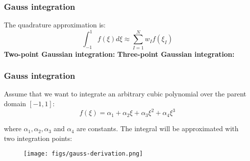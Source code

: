 \documentclass[notes]{beamer}
\begin{document}
\begin{frame}
\frametitle{Gauss integration}
The quadrature approximation is:
\begin{equation*}
\int_{-1}^{1} f(\xi)d \xi \approx \sum_{I=1}^N w_I f(\xi_I)
\end{equation*}
\textbf{Two-point Gaussian integration:}
\textbf{Three-point Gaussian integration:}
\end{frame}

\begin{frame}
\frametitle{Gauss integration}
Assume that we want to integrate an arbitrary cubic polynomial over the parent domain $[-1, 1]$:
\begin{equation*}
f(\xi) = \alpha_1 + \alpha_2 \xi + \alpha_3 \xi^2 + \alpha_4 \xi^3
\end{equation*}

where $\alpha_1, \alpha_2, \alpha_3$ and $\alpha_4$ are constants. The integral will be approximated with two integration points:
\begin{figure}[ht]
	\centering
	\texttt{[image: figs/gauss-derivation.png]}
\end{figure}
\end{frame}
\end{document}

